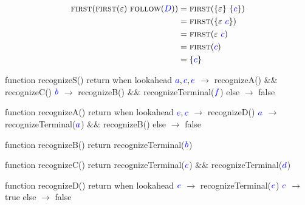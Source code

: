\documentclass{article}
\newcommand{\FIRST}{\textsc{first}}
\newcommand{\FOLLOW}{\textsc{follow}}
\newcommand{\Symbol}[1]{\textcolor{blue}{#1}}
\newcommand{\Null}{\varepsilon}
\newcommand{\Seq}{\ }
\begin{document}
\begin{align*}
  \FIRST(\FIRST(\Null) \Seq \FOLLOW(\Symbol{D})) &= \FIRST(\{\Null\} \Seq \{\Symbol{c}\})\\
  &= \FIRST(\{\Null \Seq \Symbol{c}\})\\
  &= \FIRST(\Null \Seq \Symbol{c})\\ 
  &= \FIRST(\Symbol{c})\\
  &= \{\Symbol{c}\}
\end{align*}

\begin{algorithm}
  function recognizeS()
    return when lookahead
      $\Symbol{a}, \Symbol{c}, \Symbol{e}$ $\rightarrow$ recognizeA() $\&\&$ recognizeC()
      $\Symbol{b}$ $\rightarrow$ recognizeB() $\&\&$ recognizeTerminal($\Symbol{f}$)
      else $\rightarrow$ false

  function recognizeA()
    return when lookahead
      $\Symbol{e}, \Symbol{c}$ $\rightarrow$ recognizeD()
      $\Symbol{a}$ $\rightarrow$ recognizeTerminal($\Symbol{a}$) $\&\&$ recognizeB()
      else $\rightarrow$ false

  function recognizeB()
    return recognizeTerminal($\Symbol{b}$)

  function recognizeC()
    return recognizeTerminal($\Symbol{c}$) $\&\&$ recognizeTerminal($\Symbol{d}$)

  function recognizeD()
    return when lookahead
      $\Symbol{e}$ $\rightarrow$ recognizeTerminal($\Symbol{e}$)
      $\Symbol{c}$ $\rightarrow$ true
      else $\rightarrow$ false
\end{algorithm}

\printbibliography
\end{document}
